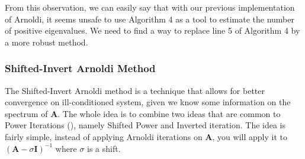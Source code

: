 \documentclass[11pt]{article}
\numberwithin{equation}{section}
\begin{document}
From this observation, we can easily say that with our previous implementation of Arnoldi, it seems unsafe to use Algorithm 4 as a tool to estimate the number of positive eigenvalues. We need to find a way to replace line 5 of Algorithm 4 by a more robust method.

\subsubsection{Shifted-Invert Arnoldi Method}
The Shifted-Invert Arnoldi method is a technique that allows for better convergence on ill-conditioned system, given we know some information on the spectrum of $\mathbf{A}$. The whole idea is to combine two ideas that are common to Power Iterations (\cite{saad2011numerical}), namely Shifted Power and Inverted iteration. The idea is fairly simple, instead of applying Arnoldi iterations on $\mathbf{A}$, you will apply it to $(\mathbf{A}-\sigma\mathbf{I})^{-1}$ where $\sigma$ is a shift.
\end{document}
